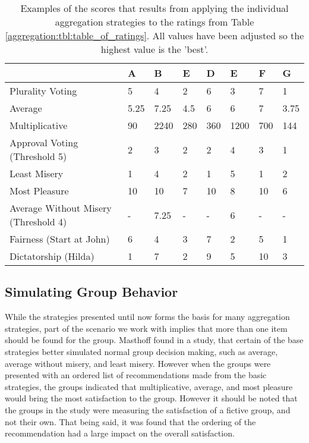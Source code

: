 \begin{table}[H]
	\centering
	\begin{tabular}{ | p{2.5cm} | p{1cm} | p{1cm} | p{1cm} | p{1cm} | p{1cm} | p{1cm} | p{1cm} | } \hline
		& \textbf{A} & \textbf{B} & \textbf{E} & \textbf{D} & \textbf{E} & \textbf{F} & \textbf{G}  \\ \hline
		Plurality Voting & 5 & 4 & 2 & 6 & 3 & 7 & 1 \\ \hline
		Average & 5.25 & 7.25 & 4.5 & 6 & 6 & 7 & 3.75 \\ \hline
		Multiplicative & 90 & 2240 & 280 & 360 & 1200 & 700 & 144 \\ \hline
		Approval Voting (Threshold 5) & 2 & 3 & 2 & 2 & 4 & 3 & 1 \\ \hline
		Least Misery & 1 & 4 & 2 & 1 & 5 & 1 & 2 \\ \hline
		Most Pleasure & 10 & 10 & 7 & 10 & 8 & 10 & 6 \\ \hline
		Average Without Misery (Threshold 4) & - & 7.25 & - & - & 6 & - & - \\ \hline
		Fairness (Start at John) & 6 & 4 & 3 & 7 & 2 & 5 & 1 \\ \hline
		Dictatorship (Hilda) & 1 & 7 & 2 & 9 & 5 & 10 & 3 \\ \hline
	\end{tabular}
	\caption{Examples of the scores that results from applying the individual aggregation strategies to the ratings from Table \ref{aggregation:tbl:table_of_ratings}. All values have been adjusted so the highest value is the 'best'.}
	\label{aggregation:tbl:examples_of_strategies}
\end{table}

\subsection{Simulating Group Behavior} \label{bg:aggregation:groupbehavior}
While the strategies presented until now forms the basis for many aggregation strategies, part of the scenario we work with implies that more than one item should be found for the group. Masthoff found in a study, that certain of the base strategies better simulated normal group decision making, such as average, average without misery, and least misery\cite{Masthoff2004}. However when the groups were presented with an ordered list of recommendations made from the basic strategies, the groups indicated that multiplicative, average, and most pleasure would bring the most satisfaction to the group. However it should be noted that the groups in the study were measuring the satisfaction of a fictive group, and not their own. That being said, it was found that the ordering of the recommendation had a large impact on the overall satisfaction.

